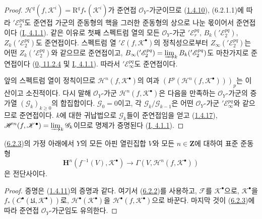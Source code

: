 \begin{proof}
$\mathscr H^q(f,\mathscr K^i)=\mathrm R^q f_*(\mathscr K^i)$가 준연접
$\mathscr O_Y$-가군이므로
(\hyperref[III.1.4.10-fr]{1.4.10}), (6.2.1.1)에 따라
$'\mathscr E_2^{pq}$도 준연접 가군의 준동형의 핵을 그러한 준동형의
상으로 나눈 몫이어서 준연접이다
(\hyperref[I.4.1.1-ko]{I, 4.1.1}). 같은 이유로 첫째 스펙트럼 열의
모든 $\mathscr O_Y$-가군 $'\mathscr E_r^{pq}$,
$B_k('\mathscr E_2^{pq})$, $Z_k('\mathscr E_2^{pq})$도 준연접이다.
스펙트럼 열 $'\mathscr E(f,\mathscr K^\bullet)$의 정칙성으로부터
$Z_\infty('\mathscr E_2^{pq})$는 어떤
$Z_k('\mathscr E_2^{pq})$와 같으므로 준연접이고,
$B_\infty('\mathscr E_2^{pq})
=\varinjlim_k B_k('\mathscr E_2^{pq})$도 마찬가지로 준연접이다
(\hyperref[0.11.2.4-fr]{0, 11.2.4} 및
\hyperref[I.4.1.1-ko]{I, 4.1.1}). 따라서
$'\mathscr E_\infty^{pq}$도 준연접이다.

앞의 스펙트럼 열이 정칙이므로
$\mathscr H^n(f,\mathscr K^\bullet)$의 여과
$(F^p(\mathscr H^n(f,\mathscr K^\bullet)))_p$는 이산이고 소진적이다.
다시 말해 $\mathscr O_Y$-가군
$\mathscr H^n(f,\mathscr K^\bullet)$은 다음을 만족하는
$\mathscr O_Y$-가군의 증가열 $(\mathscr G_k)_{k\geq0}$의 합집합이다.
$\mathscr G_0=0$이고, 각 $\mathscr G_k/\mathscr G_{k-1}$은 어떤
$\mathscr O_Y$-가군 $'\mathscr E_\infty^{pq}$와 같으므로 준연접이다.
$k$에 대한 귀납법으로 $\mathscr G_k$들이 준연접임을 얻고
(\hyperref[III.1.4.17-fr]{1.4.17}),
$\mathscr H^n(f,\mathscr K^\bullet)=\varinjlim_k\mathscr G_k$이므로
명제가 증명된다
(\hyperref[I.4.1.1-ko]{I, 4.1.1}).
\end{proof}


\begin{corollary}[6.2.4]
\label{III.6.2.4-fr}
(\hyperref[III.6.2.3-fr]{6.2.3})의 가정 아래에서 $Y$의 모든 아핀
열린집합 $V$와 모든 $n\in\mathbf Z$에 대하여 표준 준동형
\[
  \mathbf H^n(f^{-1}(V),\mathscr K^\bullet)
  \longrightarrow
  \Gamma(V,\mathscr H^n(f,\mathscr K^\bullet))
  \tag{6.2.4.1}\label{III.6.2.4.1.fr}
\]
은 전단사이다.
\end{corollary}

\begin{proof}
증명은 (\hyperref[III.1.4.11-fr]{1.4.11})의 증명과 같다. 여기서
(\hyperref[III.6.2.2-fr]{6.2.2})를 사용하고,
$\mathscr F$를 $\mathscr K^\bullet$으로,
$\mathscr K^\bullet$을
$f_*(C^\bullet(\mathfrak U,\mathscr K^\bullet))$로,
$\mathscr H^\bullet(\mathscr K^\bullet)$을
$\mathscr H^\bullet(f,\mathscr K^\bullet)$으로 바꾼다. 마지막 것이
(\hyperref[III.6.2.3-fr]{6.2.3})에 따라 준연접
$\mathscr O_Y$-가군임도 유의한다.
\end{proof}

